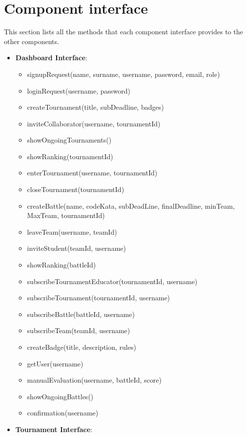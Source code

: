 \section{Component interface}
This section lists all the methods that each component interface provides to the other components.
\begin{itemize}
    \item \textbf{Dashboard Interface}:
        \begin{itemize}
            \item signupRequest(name, surname, username, password, email, role) 
            \item loginRequest(username, password)
            \item createTournament(title, subDeadline, badges)  
            \item inviteCollaborator(username, tournamentId)
            \item showOngoingTournaments()
            \item showRanking(tournamentId)
            \item enterTournament(username, tournamentId)
            \item closeTournament(tournamentId)
            \item createBattle(name, codeKata, subDeadLine, finalDeadline, minTeam, MaxTeam, tournamentId)
            \item leaveTeam(username, teamId)
            \item inviteStudent(teamId, username)
            \item showRanking(battleId)
            \item subscribeTournamentEducator(tournamentId, username)
            \item subscribeTournament(tournamentId, username)
            \item subscribeBattle(battleId, username)
            \item subscribeTeam(teamId, username)
            \item createBadge(title, description, rules)
            \item getUser(username)
            \item manualEvaluation(username, battleId, score)
            \item showOngoingBattles()
            \item confirmation(username)
        \end{itemize}
    \item\textbf{Tournament Interface}:

\end{itemize}
